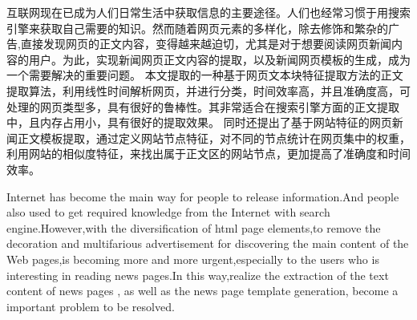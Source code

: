
\begin{cnabstract}
互联网现在已成为人们日常生活中获取信息的主要途径。人们也经常习惯于用搜索引擎来获取自己需要的知识。然而随着网页元素的多样化，除去修饰和繁杂的广告,直接发现网页的正文内容，变得越来越迫切，尤其是对于想要阅读网页新闻内容的用户。为此，实现新闻网页正文内容的提取，以及新闻网页模板的生成，成为一个需要解决的重要问题。
本文提取的一种基于网页文本块特征提取方法的正文提取算法，利用线性时间解析网页，并进行分类，时间效率高，并且准确度高，可处理的网页类型多，具有很好的鲁棒性。其非常适合在搜索引擎方面的正文提取中，且内存占用小，具有很好的提取效果。
同时还提出了基于网站特征的网页新闻正文模板提取，通过定义网站节点特征，对不同的节点统计在网页集中的权重，利用网站的相似度特征，来找出属于正文区的网站节点，更加提高了准确度和时间效率。
\end{cnabstract}


\begin{enabstract}

Internet has become the main way for people to release information.And people also used to get required knowledge from the Internet with search engine.However,with the  diversification of html page elements,to remove the decoration and multifarious advertisement for discovering the main content of the Web pages,is becoming more and more urgent,especially to the users who is interesting in reading news pages.In this way,realize  the extraction of the text content of news pages , as well as the news page template generation, become a important problem to be resolved.

\end{enabstract}
% 